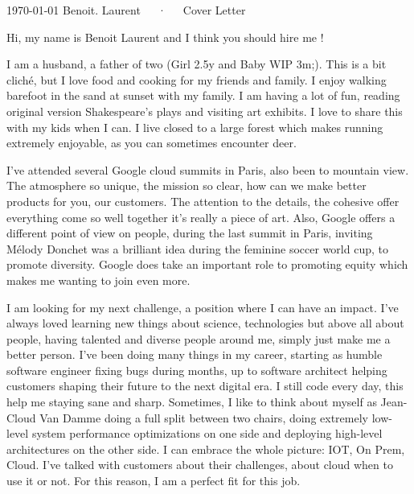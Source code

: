 \documentclass[11pt, a4paper]{awesome-cv}
\begin{document}
\makecvheader[R]

\makecvfooter
  {\today}
  {Benoit. Laurent~~~·~~~Cover Letter}
  {}

\makelettertitle

\begin{cvletter}

Hi, my name is Benoit Laurent and I think you should hire me !

I am a husband, a father of two (Girl 2.5y and Baby WIP 3m;). This is a bit cliché, but I love food and cooking for my friends and family. I enjoy walking barefoot in the sand at sunset with my family.
I am having a lot of fun, reading original version Shakespeare's plays and visiting art exhibits. I love to share this with my kids when I can.
I live closed to a large forest which makes running extremely enjoyable, as you can sometimes encounter deer.

I've attended several Google cloud summits in Paris, also been to mountain view. The atmosphere so unique,
the mission so clear, how can we make better products for you, our customers.
The attention to the details, the cohesive offer everything come so well together it's really a piece of art.
Also, Google offers a different point of view on people, during the last summit in Paris, inviting Mélody Donchet was a brilliant idea during the feminine soccer world cup, to promote diversity.
Google does take an important role to promoting equity which makes me wanting to join even more.

I am looking for my next challenge, a position where I can have an impact. I've always loved learning new things about science, technologies but above all about people, having talented and diverse people around me, simply just make me a better person.
I've been doing many things in my career, starting as humble software engineer fixing bugs during months, up to software architect helping customers shaping their future to the next digital era. I still code every day, this help me staying sane and sharp.
Sometimes, I like to think about myself as Jean-Cloud Van Damme doing a full split between two chairs, doing extremely low-level system performance optimizations on one side and deploying high-level architectures on the other side. I can embrace the whole picture: IOT, On Prem, Cloud.
I've talked with customers about their challenges, about cloud when to use it or not.
For this reason, I am a perfect fit for this job.

\end{cvletter}

\makeletterclosing
\end{document}
